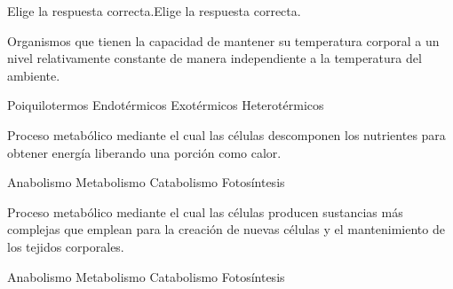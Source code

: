 
Elige la respuesta correcta.Elige la respuesta correcta.
\begin{parts}
    Organismos que tienen la capacidad de mantener su temperatura corporal a un nivel relativamente constante de manera independiente a la temperatura del ambiente.
    \begin{choices}
        \choice Poiquilotermos
        \choice Endotérmicos
        \choice Exotérmicos
        \choice Heterotérmicos
    \end{choices}

    Proceso metabólico mediante el cual las células descomponen los nutrientes para obtener energía liberando una porción como calor.
    \begin{choices}
        \choice Anabolismo
        \choice Metabolismo
        \choice Catabolismo
        \choice Fotosíntesis
    \end{choices}

    Proceso metabólico mediante el cual las células producen sustancias más complejas que emplean para la creación de nuevas células y el mantenimiento de los tejidos corporales.
    \begin{choices}
        \choice Anabolismo
        \choice Metabolismo
        \choice Catabolismo
        \choice Fotosíntesis
    \end{choices}
\end{parts}